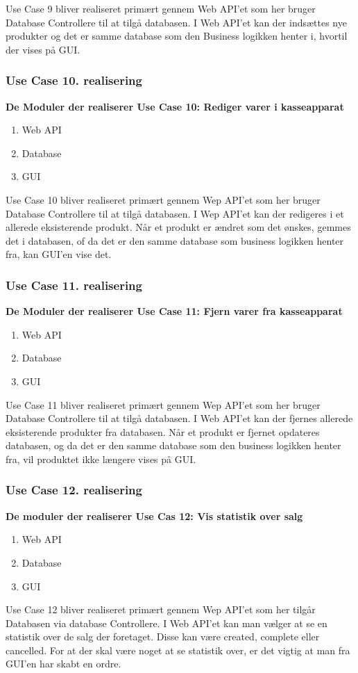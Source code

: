 Use Case 9 bliver realiseret primært gennem Web API'et som her bruger Database Controllere til at tilgå databasen. I Web API'et kan der indsættes nye produkter og det er samme database som den Business logikken henter i, hvortil der vises på GUI.


\subsubsection{Use Case 10. realisering}
\textbf{De Moduler der realiserer Use Case 10: Rediger varer i kasseapparat}

\begin{enumerate}
	\item Web API
	\item Database
	\item GUI
\end{enumerate}

Use Case 10 bliver realiseret primært gennem Wep API'et som her bruger Database Controllere til at tilgå databasen. I Wep API'et kan der redigeres i et allerede eksisterende produkt. Når et produkt er ændret som det ønskes, gemmes det i databasen, of da det er den samme database som business logikken henter fra, kan GUI'en vise det.

\subsubsection{Use Case 11. realisering}
\textbf{De Moduler der realiserer Use Case 11: Fjern varer fra kasseapparat}

\begin{enumerate}
	\item Web API
	\item Database
	\item GUI
\end{enumerate}
	
Use Case 11 bliver realiseret primært gennem Wep API'et som her bruger Database Controllere til at tilgå databasen. I Web API'et kan der fjernes allerede eksisterende produkter fra databasen. Når et produkt er fjernet opdateres databasen, og da det er den samme database som den business logikken henter fra, vil produktet ikke længere vises på GUI. 

\subsubsection{Use Case 12. realisering}
\textbf{De moduler der realiserer Use Cas 12: Vis statistik over salg}

\begin{enumerate}
	\item Web API
	\item Database
	\item GUI
\end{enumerate}

Use Case 12 bliver realiseret primært gennem Wep API'et som her tilgår Databasen via database Controllere. I Web API'et kan man vælger at se en statistik over de salg der foretaget. Disse kan være created, complete eller cancelled. For at der skal være noget at se statistik over, er det vigtig at man fra GUI'en har skabt en ordre. 



